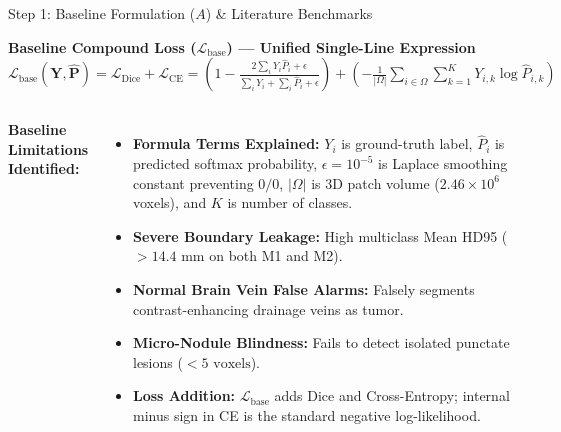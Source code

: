 \documentclass[aspectratio=169, 10pt]{beamer}
\begin{document}
\begin{frame}{Step 1: Baseline Formulation ($A$) \& Literature Benchmarks}
  \begin{block}{\small \textbf{Baseline Compound Loss ($\mathcal{L}_{\text{base}}$) --- Unified Single-Line Expression}}
    \centering
    $\mathcal{L}_{\text{base}}(\mathbf{Y}, \hat{\mathbf{P}}) = \mathcal{L}_{\text{Dice}} + \mathcal{L}_{\text{CE}} = \left( 1 - \frac{2 \sum_i Y_i \hat{P}_i + \epsilon}{\sum_i Y_i + \sum_i \hat{P}_i + \epsilon} \right) + \left( - \frac{1}{|\Omega|} \sum_{i \in \Omega} \sum_{k=1}^K Y_{i,k} \log \hat{P}_{i,k} \right)$
    
    \vspace{2pt}
  \end{block}
  
  \vspace{0.15cm}
  \begin{columns}[T]
    \textbf{Baseline Limitations Identified:}
    \begin{itemize}\itemsep=3pt
      \scriptsize
      \item \textbf{Formula Terms Explained:} $Y_i$ is ground-truth label, $\hat{P}_i$ is predicted softmax probability, $\epsilon=10^{-5}$ is Laplace smoothing constant preventing $0/0$, $|\Omega|$ is 3D patch volume ($2.46\times 10^6$ voxels), and $K$ is number of classes.
      \item \textbf{Severe Boundary Leakage:} High multiclass Mean HD95 ($>14.4\text{ mm}$ on both M1 and M2).
      \item \textbf{Normal Brain Vein False Alarms:} Falsely segments contrast-enhancing drainage veins as tumor.
      \item \textbf{Micro-Nodule Blindness:} Fails to detect isolated punctate lesions ($<5\text{ voxels}$).
      \item \textbf{Loss Addition:} $\mathcal{L}_{\text{base}}$ adds Dice and Cross-Entropy; internal minus sign in CE is the standard negative log-likelihood.
    \end{itemize}
    

\end{columns}
\end{frame}
\end{document}
